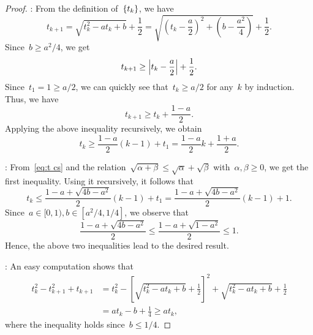 \documentclass[../main]{subfiles}
\begin{document}
\begin{proof}
    :
    From the definition of~$\set{t_k}$, we have
    \[ \label{eq:t cs} 
        t_{k + 1} = \sqrt{t_k^2 - a t_k + b} + \frac{1}{2}
        = \sqrt{\left( t_k - \frac{a}{2} \right)^2 + \left( b - \frac{a^2}{4} \right)} + \frac{1}{2}
    .\]
    Since~$b \ge a^2 / 4$, we get
    \[
        t_{k + 1} \ge \abs*{t_k - \frac{a}{2}} + \frac{1}{2}
    .\]
    Since~$t_1 = 1 \ge a / 2$, we can quickly see that~$t_k \ge a / 2$ for any~$k$ by induction.
    Thus, we have
    \[
        t_{k + 1} \ge t_k + \frac{1 - a}{2}
    .\]
    Applying the above inequality recursively, we obtain
    \[
        t_k \ge \frac{1 - a}{2} (k - 1) + t_1 = \frac{1 - a}{2} k + \frac{1 + a}{2}
    .\]

    :
    From~\cref{eq:t cs} and the relation~$\sqrt{\alpha + \beta} \le \sqrt{\alpha} + \sqrt{\beta}$ with~$\alpha, \beta \ge 0$, we get the first inequality.
    Using it recursively, it follows that
    \[
        t_k \le \frac{1 - a + \sqrt{4 b - a^2}}{2} (k - 1) + t_1 = \frac{1 - a + \sqrt{4 b - a^2}}{2} (k - 1) + 1
    .\] 
    Since~$a \in [0, 1), b \in [a^2 / 4, 1 / 4]$, we observe that
    \[
        \frac{1 - a + \sqrt{4 b - a^2}}{2} \le \frac{1 - a + \sqrt{1 - a^2}}{2} \le 1
    .\] 
    Hence, the above two inequalities lead to the desired result.

    :
    An easy computation shows that
    \[
        \begin{split}
            t_k^2 - t_{k + 1}^2 + t_{k + 1} &= t_k^2 - \left[ \sqrt{t_k^2 - a t_k + b} + \frac{1}{2} \right]^2 + \sqrt{t_k^2 - a t_k + b} + \frac{1}{2} \\
                                            &= a t_k - b + \frac{1}{4} \ge a t_k
    ,\end{split}
    \] 
    where the inequality holds since~$b \le 1 / 4$.


\end{proof}
\end{document}
